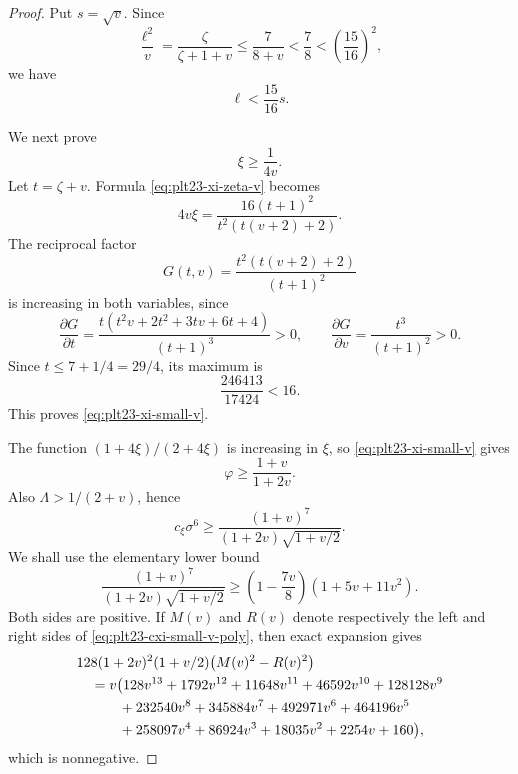 \documentclass[11pt]{article}
\numberwithin{equation}{section}
\begin{document}
\begin{proof}
  Put $s=\sqrt v$.  Since
  \[
    \frac{\ell^2}{v}=\frac{\zeta}{\zeta+1+v}
    \le\frac{7}{8+v}<\frac{7}{8}<\left(\frac{15}{16}\right)^2,
  \]
  we have
  \begin{equation}\label{eq:plt23-ell-small-v}
    \ell<\frac{15}{16}s.
  \end{equation}

  We next prove
  \begin{equation}\label{eq:plt23-xi-small-v}
    \xi\ge\frac{1}{4v}.
  \end{equation}
  Let $t=\zeta+v$.  Formula \eqref{eq:plt23-xi-zeta-v} becomes
  \[
    4v\xi=
    \frac{16(t+1)^2}{t^2(t(v+2)+2)}.
  \]
  The reciprocal factor
  \[
    G(t,v)=\frac{t^2(t(v+2)+2)}{(t+1)^2}
  \]
  is increasing in both variables, since
  \[
    \frac{\partial G}{\partial t}
    =\frac{t(t^2v+2t^2+3tv+6t+4)}{(t+1)^3}>0,
    \qquad
    \frac{\partial G}{\partial v}=\frac{t^3}{(t+1)^2}>0.
  \]
  Since
  $t\le7+1/4=29/4$, its maximum is
  \[
    \frac{246413}{17424}<16.
  \]
  This proves \eqref{eq:plt23-xi-small-v}.

  The function $(1+4\xi)/(2+4\xi)$ is increasing in $\xi$, so
  \eqref{eq:plt23-xi-small-v} gives
  \[
    \varphi\ge\frac{1+v}{1+2v}.
  \]
  Also $\Lambda>1/(2+v)$, hence
  \[
    c_\xi\sigma^6
    \ge\frac{(1+v)^7}{(1+2v)\sqrt{1+v/2}}.
  \]
  We shall use the elementary lower bound
  \begin{equation}\label{eq:plt23-cxi-small-v-poly}
    \frac{(1+v)^7}{(1+2v)\sqrt{1+v/2}}
    \ge\left(1-\frac{7v}{8}\right)(1+5v+11v^2).
  \end{equation}
  Both sides are positive.  If $M(v)$ and $R(v)$ denote respectively
  the left and right sides of \eqref{eq:plt23-cxi-small-v-poly}, then exact
  expansion gives
  \begin{align}
    &128(1+2v)^2(1+v/2)\bigl(M(v)^2-R(v)^2\bigr) \notag\\
    &\quad=v\bigl(128v^{13}+1792v^{12}+11648v^{11}+46592v^{10}
    +128128v^9 \notag\\
    &\qquad\quad+232540v^8+345884v^7+492971v^6+464196v^5 \notag\\
    &\qquad\quad+258097v^4+86924v^3+18035v^2+2254v+160\bigr), \label{eq:plt23-small-v-square-diff}
  \end{align}
  which is nonnegative.


\end{proof}
\end{document}
